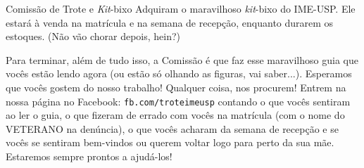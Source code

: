 \begin{secao}{Comissão de Trote e \textit{Kit}-bixo}
Adquiram o maravilhoso \textit{kit}-bixo do IME-USP. Ele estará à venda na
matrícula e na semana de recepção, enquanto durarem os estoques. (Não vão chorar
depois, hein?)

Para terminar, além de tudo isso, a Comissão é que faz esse maravilhoso guia que
vocês estão lendo agora (ou estão só olhando as figuras, vai
saber...). Esperamos que vocês gostem do nosso trabalho! Qualquer coisa, nos
procurem! Entrem na nossa página no Facebook: {\tt fb.com/troteimeusp} contando
o que vocês sentiram ao ler o guia, o que fizeram de errado com vocês na
matrícula (com o nome do VETERANO na denúncia), o que vocês acharam da semana
de recepção e se vocês se sentiram bem-vindos ou querem voltar logo para perto
da sua mãe. Estaremos sempre prontos a ajudá-los!
\end{secao}
